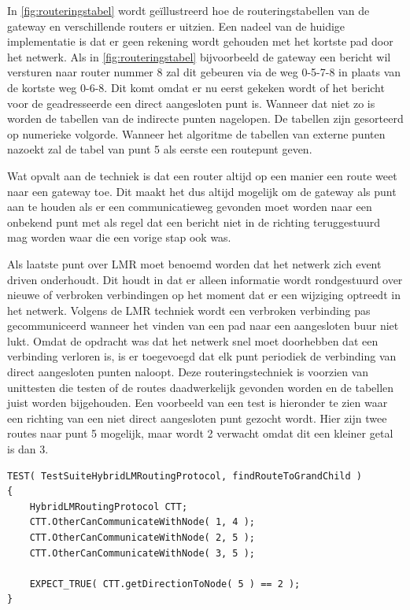 \documentclass[a4paper, 11pt, oneside]{report}
\begin{document}
In \autoref{fig:routeringstabel} wordt geïllustreerd hoe de routeringstabellen van de gateway en verschillende routers er uitzien.
Een nadeel van de huidige implementatie is dat er geen rekening wordt gehouden met het kortste pad door het netwerk.
Als in \autoref{fig:routeringstabel} bijvoorbeeld de gateway een bericht wil versturen naar router nummer 8 zal dit gebeuren via de weg 0-5-7-8 in plaats van de kortste weg 0-6-8. Dit komt omdat er nu eerst gekeken wordt of het bericht voor de geadresseerde een direct aangesloten punt is. Wanneer dat niet zo is worden de tabellen van de indirecte punten nagelopen. De tabellen zijn gesorteerd op numerieke volgorde. Wanneer het algoritme de tabellen van externe punten nazoekt zal de tabel van punt 5 als eerste een routepunt geven.

Wat opvalt aan de techniek is dat een router altijd op een manier een route weet naar een gateway toe. Dit maakt het dus altijd mogelijk om de gateway als punt aan te houden als er een communicatieweg gevonden moet worden naar een onbekend punt met als regel dat een bericht niet in de richting teruggestuurd mag worden waar die een vorige stap ook was.

Als laatste punt over LMR moet benoemd worden dat het netwerk zich event driven onderhoudt.
Dit houdt in dat er alleen informatie wordt rondgestuurd over nieuwe of verbroken verbindingen op het moment dat er een wijziging optreedt in het netwerk. 
Volgens de LMR techniek wordt een verbroken verbinding pas gecommuniceerd wanneer het vinden van een pad naar een aangesloten buur niet lukt.
Omdat de opdracht was dat het netwerk snel moet doorhebben dat een verbinding verloren is, is er toegevoegd dat elk punt periodiek de verbinding van direct aangesloten punten naloopt. 
Deze routeringstechniek is voorzien van unittesten die testen of de routes daadwerkelijk gevonden worden en de tabellen juist worden bijgehouden.
Een voorbeeld van een test is hieronder te zien waar een richting van een niet direct aangesloten punt gezocht wordt.
Hier zijn twee routes naar punt 5 mogelijk, maar wordt 2 verwacht omdat dit een kleiner getal is dan 3.
\begin{lstlisting}
TEST( TestSuiteHybridLMRoutingProtocol, findRouteToGrandChild )
{
	HybridLMRoutingProtocol CTT;
	CTT.OtherCanCommunicateWithNode( 1, 4 );
	CTT.OtherCanCommunicateWithNode( 2, 5 );
	CTT.OtherCanCommunicateWithNode( 3, 5 );

	EXPECT_TRUE( CTT.getDirectionToNode( 5 ) == 2 );
}
\end{lstlisting}
\end{document}
